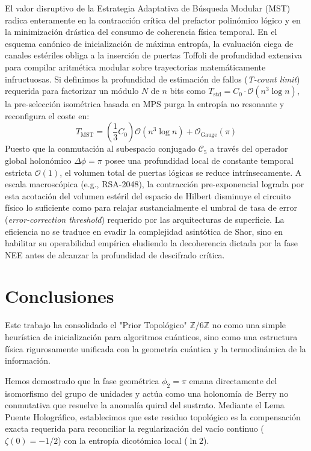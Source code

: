 \documentclass[12pt,a4paper]{article}
\theoremstyle{plain}
\theoremstyle{definition}
\theoremstyle{remark}
\begin{document}
El valor disruptivo de la Estrategia Adaptativa de Búsqueda Modular (MST) radica enteramente en la contracción crítica del prefactor polinómico lógico y en la minimización drástica del consumo de coherencia física temporal. En el esquema canónico de inicialización de máxima entropía, la evaluación ciega de canales estériles obliga a la inserción de puertas Toffoli de profundidad extensiva para compilar aritmética modular sobre trayectorias matemáticamente infructuosas. Si definimos la profundidad de estimación de fallos (\textit{T-count limit}) requerida para factorizar un módulo $N$ de $n$ bits como $T_{\text{std}} = C_0 \cdot \mathcal{O}(n^3 \log n)$, la pre-selección isométrica basada en MPS purga la entropía no resonante y reconfigura el coste en:
\begin{equation}
T_{\text{MST}} = \left(\frac{1}{3} C_0 \right) \mathcal{O}(n^3 \log n) + \mathcal{O}_{\text{Gauge}}(\pi)
\label{eq:toffoli_reduction}
\end{equation}
Puesto que la conmutación al subespacio conjugado $\mathcal{C}_5$ a través del operador global holonómico $\Delta\phi = \pi$ posee una profundidad local de constante temporal estricta $\mathcal{O}(1)$, el volumen total de puertas lógicas se reduce intrínsecamente. A escala macroscópica (e.g., RSA-2048), la contracción pre-exponencial lograda por esta acotación del volumen estéril del espacio de Hilbert disminuye el circuito físico lo suficiente como para relajar sustancialmente el umbral de tasa de error (\textit{error-correction threshold}) requerido por las arquitecturas de superficie. La eficiencia no se traduce en evadir la complejidad asintótica de Shor, sino en habilitar su operabilidad empírica eludiendo la decoherencia dictada por la fase NEE antes de alcanzar la profundidad de descifrado crítica.

\section{Conclusiones}
\label{sec:conclusiones}

Este trabajo ha consolidado el "Prior Topológico" $\mathbb{Z}/6\mathbb{Z}$ no como una simple heurística de inicialización para algoritmos cuánticos, sino como una estructura física rigurosamente unificada con la geometría cuántica y la termodinámica de la información. 

Hemos demostrado que la fase geométrica $\phi_2 = \pi$ emana directamente del isomorfismo del grupo de unidades y actúa como una holonomía de Berry no conmutativa que resuelve la anomalía quiral del sustrato. Mediante el Lema Puente Holográfico, establecimos que este residuo topológico es la compensación exacta requerida para reconciliar la regularización del vacío continuo ($\zeta(0) = -1/2$) con la entropía dicotómica local ($\ln 2$). 
\end{document}
